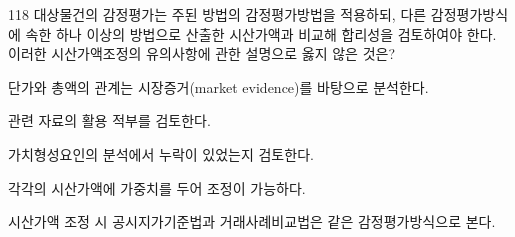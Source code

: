 \begin{question}{118}
대상물건의 감정평가는 주된 방법의 감정평가방법을 적용하되, 다른 감정평가방식에 속한 하나 이상의 방법으로 산출한 시산가액과 비교해 합리성을 검토하여야 한다. 이러한 시산가액조정의 유의사항에 관한 설명으로 옳지 않은 것은?
\begin{choices}
  \item 단가와 총액의 관계는 시장증거(market evidence)를 바탕으로 분석한다.
  \item 관련 자료의 활용 적부를 검토한다.
  \item 가치형성요인의 분석에서 누락이 있었는지 검토한다.
  \item 각각의 시산가액에 가중치를 두어 조정이 가능하다.
  \item 시산가액 조정 시 공시지가기준법과 거래사례비교법은 같은 감정평가방식으로 본다.
\end{choices}
\end{question}
